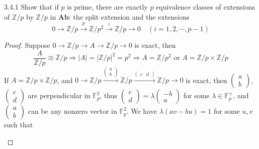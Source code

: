 \documentclass[../main.tex]{subfiles}
\begin{document}
\begin{customexercise}{3.4.1}
Show that if $p$ is prime, there are exactly $p$ equivalence classes of extensions of $\mathbb Z/p$ by $\mathbb Z/p$ in $\mathbf {Ab}$: the split extension and the extensions
\[0\to\mathbb Z/p\xrightarrow{p}\mathbb Z/p^2\xrightarrow i\mathbb Z/p\to0\quad(i=1,2,\cdots,p-1)\]
\end{customexercise}

\begin{proof}
Suppose $0\to\mathbb Z/p\to A\to\mathbb Z/p\to0$ is exact, then
\[\dfrac{A}{\mathbb Z/p}\cong\mathbb Z/p\Rightarrow|A|=|\mathbb Z/p|^2=p^2\Rightarrow A=\mathbb Z/p^2\text{ or }A=\mathbb Z/p\times\mathbb Z/p\]
If $A=\mathbb Z/p\times\mathbb Z/p$, and $0\to\mathbb Z/p\xrightarrow{\begin{pmatrix}
a \\
b
\end{pmatrix}}\mathbb Z/p\xrightarrow{\begin{pmatrix}
c&d
\end{pmatrix}}\mathbb Z/p\to 0$ is exact, then $\begin{pmatrix}
a \\
b
\end{pmatrix}$, $\begin{pmatrix}
c \\
d
\end{pmatrix}$ are perpendicular in $\mathbb F_p^2$, thus $\begin{pmatrix}
c \\
d
\end{pmatrix}=\lambda\begin{pmatrix}
-b \\
a
\end{pmatrix}$ for some $\lambda\in\mathbb F_p^\times$, and $\begin{pmatrix}
a \\
b
\end{pmatrix}$ can be any nonzero vector in $\mathbb F_p^2$. We have $\lambda(av-bu)=1$ for some $u,v$ such that
\begin{center}
\end{center}
\end{proof}
\end{document}
